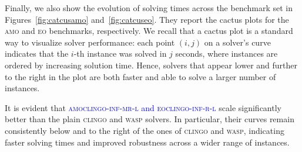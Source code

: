 \documentclass[preprint,authoryear]{elsarticle}
\newcommand{\amoclingoinfmrlazy}{\textsc{amoclingo-inf-mr-l}\xspace}
\newcommand{\eoclingoinfrlazy}{\textsc{eoclingo-inf-r-l}\xspace}
\theoremstyle{definition}
\begin{document}
Finally, we also show the evolution of solving times across the benchmark set
in Figures~\ref{fig:catcusamo} and~\ref{fig:catcuseo}.
They report the cactus plots for the \textsc{amo} and \textsc{eo} benchmarks, respectively.  
We recall that a cactus plot is a standard way to visualize solver performance: each point $(i, j)$ on a solver's curve indicates that the $i$-th instance was solved in $j$ seconds, where instances are ordered by increasing solution time.  
Hence, solvers that appear lower and further to the right in the plot are both faster and able to solve a larger number of instances.

It is evident that \textcolor{blue}{\amoclingoinfmrlazy and \eoclingoinfrlazy} scale significantly better than the plain \textsc{clingo} and \textsc{wasp} solvers.  
In particular, their curves remain consistently below and to the right of the ones of \textsc{clingo} and \textsc{wasp}, indicating faster solving times and improved robustness across a wider range of instances.
\end{document}
